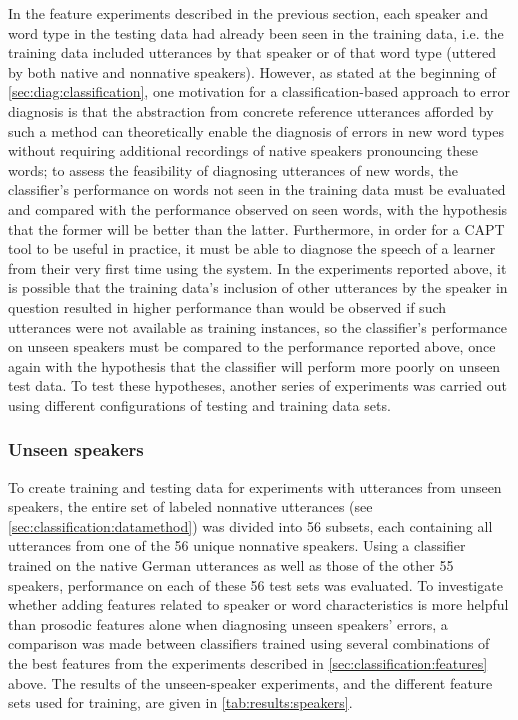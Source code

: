 	
	In the feature experiments described in the previous section, each speaker and word type in the testing data had already been seen in the training data, i.e. the training data included utterances by that speaker or of that word type (uttered by both native and nonnative speakers). However, as stated at the beginning of \cref{sec:diag:classification}, one motivation for a classification-based approach to error diagnosis is that the abstraction from concrete reference utterances afforded by such a method can theoretically enable the diagnosis of errors in new word types without requiring additional recordings of native speakers pronouncing these words; to assess the feasibility of diagnosing utterances of new words, the classifier's performance on words not seen in the training data must be evaluated and compared with the performance observed on seen words, with the hypothesis that the former will be better than the latter. Furthermore, in order for a CAPT tool to be useful in practice, it must be able to diagnose the speech of a learner from their very first time using the system. In the experiments reported above, it is possible that the training data's inclusion of other utterances by the speaker in question resulted in higher performance than would be observed if such utterances were not available as training instances, so the classifier's performance on unseen speakers must be compared to the performance reported above, once again with the hypothesis that the classifier will perform more poorly on unseen test data. To test these hypotheses, another series of experiments was carried out using different configurations of testing and training data sets. 
	
	
	\subsubsection{Unseen speakers}	
	
	To create training and testing data for experiments with utterances from unseen speakers, the entire set of labeled nonnative utterances (see \cref{sec:classification:datamethod}) was divided into 56 subsets, each containing all utterances from one of the 56 unique nonnative speakers. Using a classifier trained on the native German utterances as well as those of the other 55 speakers, performance on each of these 56 test sets was evaluated. To investigate whether adding features related to speaker or word characteristics is more helpful than prosodic features alone when diagnosing unseen speakers' errors, a comparison was made between classifiers trained using several combinations of the best features from the experiments described in \cref{sec:classification:features} above. The results of the unseen-speaker experiments, and the different feature sets used for training, are given in \cref{tab:results:speakers}.
		
